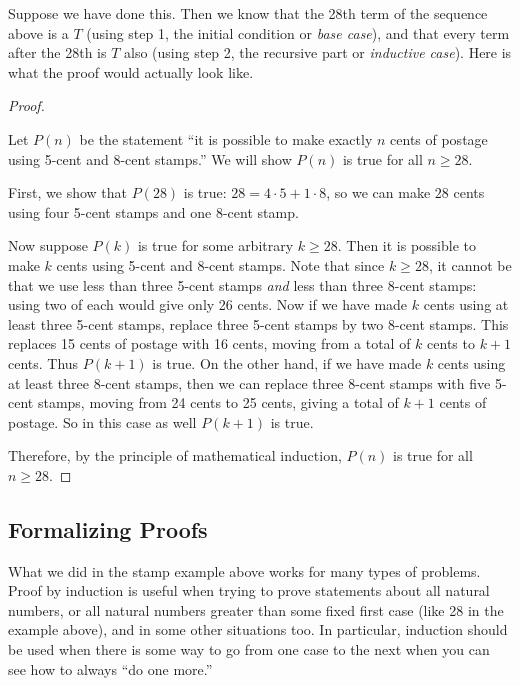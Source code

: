 \documentclass[10pt,]{book}
\theoremstyle{plain}
\theoremstyle{definition}
\theoremstyle{definition}
\theoremstyle{definition}
\numberwithin{equation}{chapter}
\begin{document}
Suppose we have done this. Then we know that the 28th term of the sequence above is a \(T\) (using step 1, the initial condition or \emph{base case}), and that every term after the 28th is \(T\) also (using step 2, the recursive part or \emph{inductive case}). Here is what the proof would actually look like.
%
\begin{proof}\hypertarget{proof-13}{}

Let \(P(n)\) be the statement ``it is possible to make exactly \(n\) cents of postage using 5-cent and 8-cent stamps.'' We will show \(P(n)\) is true for all \(n \ge 28\).
%
\par

First, we show that \(P(28)\) is true: \(28 =  4 \cdot 5+ 1\cdot 8\), so we can make \(28\) cents using four 5-cent stamps and one 8-cent stamp.
%
\par

Now suppose \(P(k)\) is true for some arbitrary \(k \ge 28\). Then it is possible to make \(k\) cents using 5-cent and 8-cent stamps. Note that since \(k \ge 28\), it cannot be that we use less than three 5-cent stamps \emph{and} less than three 8-cent stamps: using two of each would give only 26 cents. Now if we have made \(k\) cents using at least three 5-cent stamps, replace three 5-cent stamps by two 8-cent stamps. This replaces 15 cents of postage with 16 cents, moving from a total of \(k\) cents to \(k+1\) cents. Thus \(P(k+1)\) is true. On the other hand, if we have made \(k\) cents using at least three 8-cent stamps, then we can replace three 8-cent stamps with five 5-cent stamps, moving from 24 cents to 25 cents, giving a total of \(k+1\) cents of postage. So in this case as well \(P(k+1)\) is true.
%
\par

Therefore, by the principle of mathematical induction, \(P(n)\) is true for all \(n \ge 28\).
%
\end{proof}
\typeout{************************************************}
\typeout{************************************************}
\subsection[Formalizing Proofs]{Formalizing Proofs}\label{subsec_induction-formproofs}

What we did in the stamp example above works for many types of problems. Proof by induction is useful when trying to prove statements about all natural numbers, or all natural numbers greater than some fixed first case (like 28 in the example above), and in some other situations too. In particular, induction should be used when there is some way to go from one case to the next \textendash{} when you can see how to always ``do one more.''
%
\par
\end{document}
